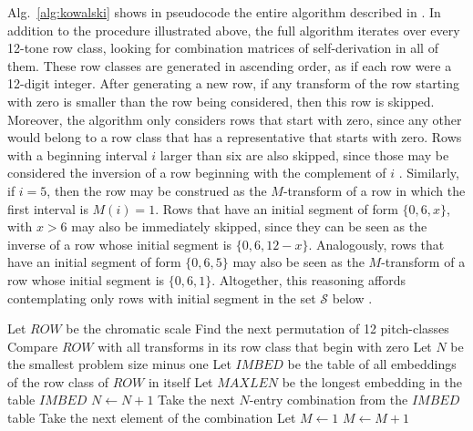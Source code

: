 Alg.~\ref{alg:kowalski} shows in pseudocode the entire algorithm described in \cite{Kowalski1987b}. In addition to the procedure illustrated above, the full algorithm iterates over every 12-tone row class, looking for combination matrices of self-derivation in all of them. These row classes are generated in ascending order, as if each row were a 12-digit integer. After generating a new row, if any transform of the row starting with zero is smaller than the row being considered, then this row is skipped. Moreover, the algorithm only considers rows that start with zero, since any other would belong to a row class that has a representative that starts with zero. Rows with a beginning interval $i$ larger than six are also skipped, since those may be considered the inversion of a row beginning with the complement of $i$ \cite[34]{Kowalski1987b}. Similarly, if $i = 5$, then the row may be construed as the $M$-transform of a row in which the first interval is $M(i) = 1$. Rows that have an initial segment of form $\{0, 6, x\}$, with $x > 6$ may also be immediately skipped, since they can be seen as the inverse of a row whose initial segment is $\{0, 6, 12 - x\}$. Analogously, rows that have an initial segment of form $\{0, 6, 5\}$ may also be seen as the $M$-transform of a row whose initial segment is $\{0, 6, 1\}$. Altogether, this reasoning affords contemplating only rows with initial segment in the set $\mathcal{S}$ below \cite[35]{Kowalski1987b}.

\begin{algorithm2e}
\caption{\cite[35, 36, 37]{Kowalski1987b}}
\label{alg:kowalski}
\DontPrintSemicolon
{}
Let $ROW$ be the chromatic scale\;
Find the next permutation of 12 pitch-classes\;
Compare $ROW$ with all transforms in its row class that begin with zero\;
Let $N$ be the smallest problem size minus one\;
Let $IMBED$ be the table of all embeddings of the row class of $ROW$ in itself\;
Let $MAXLEN$ be the longest embedding in the table $IMBED$\;
$N \gets N + 1$\;
Take the next $N$-entry combination from the $IMBED$ table\;
Take the next element of the combination\;
Let $M \gets 1$\;
$M \gets M + 1$\;
\end{algorithm2e}

